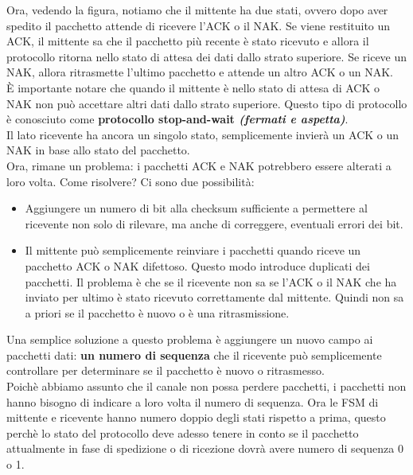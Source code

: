 \documentclass[11pt,a4paper]{article}
\begin{document}
Ora, vedendo la figura, notiamo che il mittente ha due stati, ovvero dopo aver spedito il pacchetto attende di ricevere l'ACK o il NAK. Se viene restituito un ACK, il mittente sa che il pacchetto più recente è stato ricevuto e allora il protocollo ritorna nello stato di attesa dei dati dallo strato superiore. Se riceve un NAK, allora ritrasmette l'ultimo pacchetto e attende un altro ACK o un NAK. \\
È importante notare che quando il mittente è nello stato di attesa di ACK o NAK non può accettare altri dati dallo strato superiore. Questo tipo di protocollo è conosciuto come \textbf{protocollo stop-and-wait \textit{(fermati e aspetta)}}. \\
Il lato ricevente ha ancora un singolo stato, semplicemente invierà un ACK o un NAK in base allo stato del pacchetto. \\
Ora, rimane un problema: i pacchetti ACK e NAK potrebbero essere alterati a loro volta. Come risolvere? Ci sono due possibilità:
\begin{itemize}
	\item Aggiungere un numero di bit alla checksum sufficiente a permettere al ricevente non solo di rilevare, ma anche di correggere, eventuali errori dei bit.
	\item Il mittente può semplicemente reinviare i pacchetti quando riceve un pacchetto ACK o NAK difettoso. Questo modo introduce duplicati dei pacchetti. Il problema è che se il ricevente non sa se l'ACK o il NAK che ha inviato per ultimo è stato ricevuto correttamente dal mittente. Quindi non sa a priori se il pacchetto è nuovo o è una ritrasmissione.
\end{itemize}
Una semplice soluzione a questo problema è aggiungere un nuovo campo ai pacchetti dati: \textbf{un numero di sequenza} che il ricevente può semplicemente controllare per determinare se il pacchetto è nuovo o ritrasmesso. \\
Poichè abbiamo assunto che il canale non possa perdere pacchetti, i pacchetti non hanno bisogno di indicare a loro volta il numero di sequenza. Ora le FSM di mittente e ricevente hanno numero doppio degli stati rispetto a prima, questo perchè lo stato del protocollo deve adesso tenere in conto se il pacchetto attualmente in fase di spedizione o di ricezione dovrà avere numero di sequenza 0 o 1. \pagebreak
\end{document}
